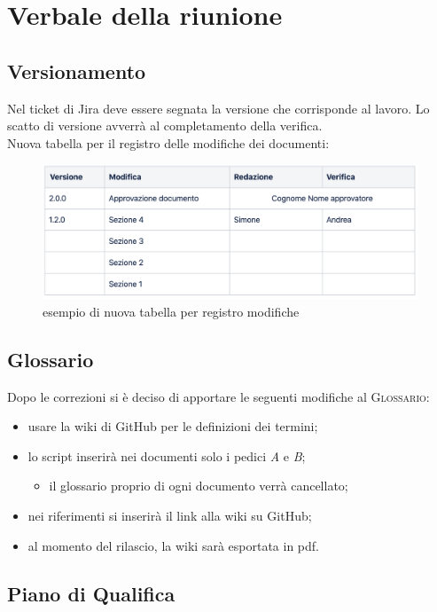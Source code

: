 \section{Verbale della riunione}
\subsection{Versionamento}
Nel ticket di Jira deve essere segnata la versione che corrisponde al lavoro. Lo scatto di versione avverrà al completamento della verifica.
\\Nuova tabella per il registro delle modifiche dei documenti:
\begin{figure}[H]
	\centering
	\includegraphics[scale=0.52]{res/images/tabella.png}
	\caption{esempio di nuova tabella per registro modifiche}
\end{figure}

\subsection{Glossario}
Dopo le correzioni si è deciso di apportare le seguenti modifiche al \textsc{Glossario}:
\begin{itemize}
	\item usare la wiki di GitHub per le definizioni dei termini;
	\item lo script inserirà nei documenti solo i pedici \textit{A} e \textit{B};
	\begin{itemize}
		\item il glossario proprio di ogni documento verrà cancellato;
	\end{itemize}
	\item nei riferimenti si inserirà il link alla wiki su GitHub;
	\item al momento del rilascio, la wiki sarà esportata in pdf.
\end{itemize}

\subsection{Piano di Qualifica}
